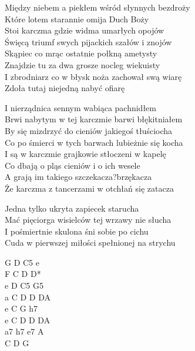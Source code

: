 \begin{text}

    Między niebem a piekłem wśród słynnych bezdroży\\
    Które lotem starannie omija Duch Boży\\
    Stoi karczma gdzie widma umarłych opojów\\
    Święcą triumf swych pijackich szałów i znojów\\
    Skąpiec co mrąc ostatnie połkną ametysty\\
    Znajdzie tu za dwa grosze nocleg wiekuisty\\
    I zbrodniarz co w błysk noża zachował swą wiarę\\
    Zdoła tutaj niejedną nabyć ofiarę

    I nierządnica sennym wabiąca pachnidłem\\
    Brwi nabytym w tej karczmie barwi błękitniałem\\
    By się mizdrzyć do cieniów jakiegoś tłuściocha\\
    Co po śmierci w tych barwach lubieżnie się kocha\\
    I są w karczmie grajkowie stłoczeni w kapelę\\
    Co dbają o pląs cieniów i o ich wesele\\
    A grają im takiego szczekacza?brzękacza\\
    Że karczma z tancerzami w otchłań się zatacza

    Jedna tylko ukryta zapiecek starucha\\
    Mać pięciorga wisielców tej wrzawy nie słucha\\
    I pośmiertnie skulona śni sobie po cichu\\
    Cuda w pierwszej miłości spełnionej na strychu
\end{text}
\begin{chord}
    \hfill\break
    \hfill\break
    \hfill\break
    G D C5 e\\
    F C D D*\\
    e D C5 G5\\
    a C D D DA\\
    e C G h7\\
    e C D D DA\\
    a7 h7 e7 A\\
    C D G
\end{chord}